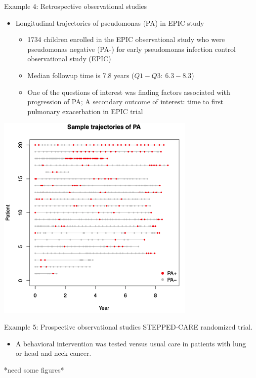 \documentclass[
  9pt,
  ignorenonframetext,
]{beamer}
\providecommand{\tightlist}{%
  \setlength{\itemsep}{0pt}\setlength{\parskip}{0pt}}
\begin{document}
\begin{frame}{}
\protect\hypertarget{section-3}{}
\begin{block}{Example 4: Retrospective observational studies}
\protect\hypertarget{example-4-retrospective-observational-studies}{}
\begin{itemize}
\item
  Longitudinal trajectories of pseudomonas (PA) in EPIC study

  \begin{itemize}
  \item
    1734 children enrolled in the EPIC observational study who were
    pseudomonas negative (PA-) for early pseudomonas infection control
    observational study (EPIC)
  \item
    Median followup time is 7.8 years (\(Q1 - Q3:\ 6.3 - 8.3\))
  \item
    One of the questions of interest was finding factors associated with
    progression of PA; A secondary outcome of interest: time to first
    pulmonary exacerbation in EPIC trial
  \end{itemize}
\end{itemize}

\begin{center}\includegraphics[width=0.5\linewidth]{figs_L1/L1-f1} \end{center}
\end{block}
\end{frame}

\begin{frame}{}
\protect\hypertarget{section-4}{}
\begin{block}{Example 5: Prospective observational studies}
\protect\hypertarget{example-5-prospective-observational-studies}{}
STEPPED-CARE randomized trial.

\begin{itemize}
\tightlist
\item
  A behavioral intervention was tested versus usual care in patients
  with lung or head and neck cancer.
\end{itemize}

\alert {*need some figures*}
\end{block}
\end{frame}
\end{document}
